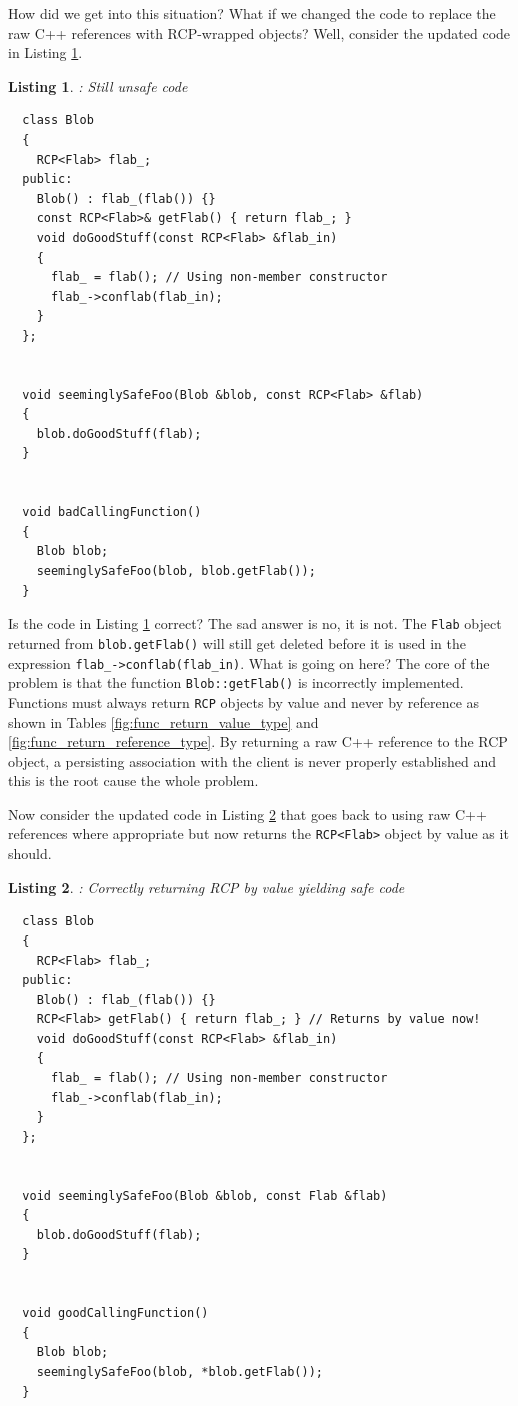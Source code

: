 \documentclass[pdf,ps2pdf,11pt]{SANDreport}
\newtheorem{listing}{Listing}
\begin{document}
How did we get into this situation?  What if we changed the code to
replace the raw C++ references with RCP-wrapped objects?  Well,
consider the updated code in Listing
{}\ref{listing:unsafe_raw_C++_reference3}.

\begin{listing}: Still unsafe code  \\
\label{listing:unsafe_raw_C++_reference3}
{\small\begin{verbatim}
  class Blob
  {
    RCP<Flab> flab_;
  public:
    Blob() : flab_(flab()) {}
    const RCP<Flab>& getFlab() { return flab_; }
    void doGoodStuff(const RCP<Flab> &flab_in)
    {
      flab_ = flab(); // Using non-member constructor
      flab_->conflab(flab_in);
    }
  };


  void seeminglySafeFoo(Blob &blob, const RCP<Flab> &flab)
  {
    blob.doGoodStuff(flab);
  }


  void badCallingFunction()
  {
    Blob blob;
    seeminglySafeFoo(blob, blob.getFlab());
  }
\end{verbatim}}
\end{listing}

Is the code in Listing {}\ref{listing:unsafe_raw_C++_reference3}
correct?  The sad answer is no, it is not.  The {}\texttt{Flab} object
returned from {}\texttt{blob.getFlab()} will still get deleted before
it is used in the expression {}\texttt{flab\_->conflab(flab\_in)}.
What is going on here?  The core of the problem is that the function
{}\texttt{Blob::getFlab()} is incorrectly implemented.  Functions must
always return {}\texttt{RCP} objects by value and never by reference
as shown in Tables {}\ref{fig:func_return_value_type} and
{}\ref{fig:func_return_reference_type}.  By returning a raw C++
reference to the RCP object, a persisting association with the client
is never properly established and this is the root cause the whole
problem.

Now consider the updated code in Listing
{}\ref{listing:safe_raw_C++_reference3} that goes back to using raw
C++ references where appropriate but now returns the
{}\texttt{RCP<Flab>} object by value as it should.

\begin{listing}: Correctly returning RCP by value yielding safe code \\
\label{listing:safe_raw_C++_reference3}
{\small\begin{verbatim}
  class Blob
  {
    RCP<Flab> flab_;
  public:
    Blob() : flab_(flab()) {}
    RCP<Flab> getFlab() { return flab_; } // Returns by value now!
    void doGoodStuff(const RCP<Flab> &flab_in)
    {
      flab_ = flab(); // Using non-member constructor
      flab_->conflab(flab_in);
    }
  };


  void seeminglySafeFoo(Blob &blob, const Flab &flab)
  {
    blob.doGoodStuff(flab);
  }


  void goodCallingFunction()
  {
    Blob blob;
    seeminglySafeFoo(blob, *blob.getFlab());
  }
\end{verbatim}}
\end{listing}
\end{document}
